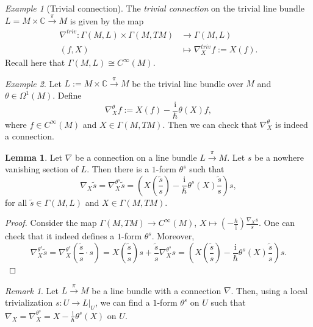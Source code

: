 \documentclass[11pt]{amsart}
\numberwithin{equation}{section}
\theoremstyle{plain}
\theoremstyle{definition}
\newtheorem{lem}{Lemma}[subsection]
\theoremstyle{remark}
\newtheorem{rem}{Remark}[subsection]
\newtheorem{ex}{Example}[subsection]
\newcommand{\I}{\mathrm{i}}
\begin{document}
\begin{ex}[Trivial connection]
The \emph{trivial connection} on the trivial line bundle $L=M\times\mathbb{C}\xrightarrow{\pi}M$ is given by the map 
\begin{align*}
\nabla^{triv}\colon \Gamma(M,L)\times \Gamma(M,TM)&\to \Gamma(M,L)\\
(f,X)&\mapsto \nabla^{triv}_Xf:=X(f).
\end{align*}
Recall here that $\Gamma(M,L)\cong C^\infty(M)$.
\end{ex}

\begin{ex}
Let $L:=M\times \mathbb{C}\xrightarrow{\pi}M$ be the trivial line bundle over $M$ and $\theta\in\Omega^1(M)$. Define 
$$\nabla_X^\theta f:=X(f)-\frac{\I}{\hbar}\theta(X)f,$$
where $f\in C^\infty(M)$ and $X\in\Gamma(M,TM)$. Then we can check that $\nabla^\theta_X$ is indeed a connection.
\end{ex}


\begin{lem}
Let $\nabla$ be a connection on a line bundle $L\xrightarrow{\pi}M$. Let $s$ be a nowhere vanishing section of $L$. Then there is a $1$-form $\theta^s$ such that 
$$\nabla_X\tilde s=\nabla_X^{\theta^s}\tilde{s}=\left( X\left(\frac{\tilde{s}}{s}\right)-\frac{\I}{\hbar}\theta^s(X)\frac{\tilde{s}}{s}\right)s,$$
for all $\tilde{s}\in\Gamma(M,L)$ and $X\in \Gamma(M,TM)$.
\end{lem}

\begin{proof}
Consider the map $\Gamma(M,TM)\to C^\infty(M)$, $X\mapsto\left(-\frac{\hbar}{\I}\right) \frac{\nabla_Xs}{s}$. One can check that it indeed defines a $1$-form $\theta^s$. Moreover, 
\[
\nabla^{\theta^s}_X\tilde{s}=\nabla^{\theta^s}_X\left(\frac{\tilde{s}}{s}\cdot s\right)=X\left(\frac{\tilde{s}}{s}\right)s+\frac{\tilde{s}}{s}\nabla^{\theta^s}_Xs=\left( X\left(\frac{\tilde{s}}{s}\right)-\frac{\I}{\hbar}\theta^s(X)\frac{\tilde{s}}{s}\right)s.
\]
\end{proof}

\begin{rem}
Let $L\xrightarrow{\pi}M$ be a line bundle with a connection $\nabla$. Then, using a local trivialization $s\colon U\to L\big|_U$, we can find a $1$-form $\theta^s$ on $U$ such that $\nabla_X=\nabla^{\theta^s}_X=X-\frac{\I}{\hbar}\theta^s(X)$ on $U$.
\end{rem}
\end{document}
